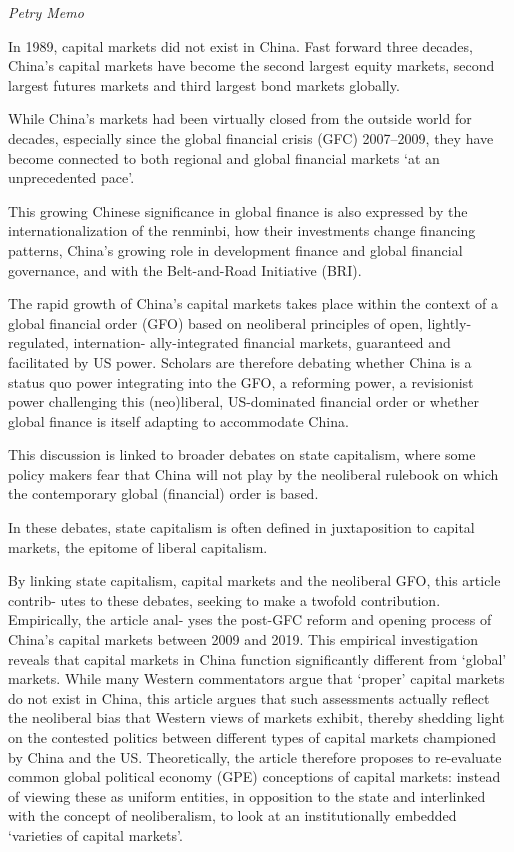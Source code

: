 \documentclass[
]{book}
\begin{document}
\emph{Petry Memo}

In 1989, capital markets did not exist in China. Fast forward three decades, China's capital
markets have become the second largest equity markets, second largest futures markets and
third largest bond markets globally.

While China's markets had been virtually
closed from the outside world for decades, especially since the global financial crisis (GFC)
2007--2009, they have become connected to both regional and global financial markets `at an
unprecedented pace'.

This growing Chinese significance in global finance
is also expressed by the internationalization of the renminbi,
how their investments change financing patterns,
China's growing
role in development finance and global financial governance,
and with the Belt-and-Road Initiative (BRI).

The rapid growth of China's capital markets takes place within the context of a global
financial order (GFO) based on neoliberal principles of open, lightly-regulated, internation-
ally-integrated financial markets, guaranteed and facilitated by US power.
Scholars are therefore debating whether China is a
status quo power integrating into the GFO,
a reforming power,
a revisionist power challenging this (neo)liberal, US-dominated financial order
or whether global finance is itself adapting to accommodate China.

This discussion is linked to broader debates on state capitalism,
where some policy makers fear that China will not play by the neoliberal
rulebook on which the contemporary global (financial) order is based.

In these debates, state capitalism is often
defined in juxtaposition to capital markets, the epitome of liberal capitalism.

By linking state capitalism, capital markets and the neoliberal GFO, this article contrib-
utes to these debates, seeking to make a twofold contribution. Empirically, the article anal-
yses the post-GFC reform and opening process of China's capital markets between 2009 and
2019. This empirical investigation reveals that capital markets in China function
significantly different from `global' markets. While many Western commentators argue
that `proper'
capital markets do not exist in China, this article argues that such assessments actually
reflect the neoliberal bias that Western views of markets exhibit, thereby shedding light
on the contested politics between different types of capital markets championed by China
and the US. Theoretically, the article therefore proposes to re-evaluate common global
political economy (GPE) conceptions of capital markets: instead of viewing these as uniform
entities, in opposition to the state and interlinked with the concept of neoliberalism, to look
at an institutionally embedded `varieties of capital markets'.
\end{document}
